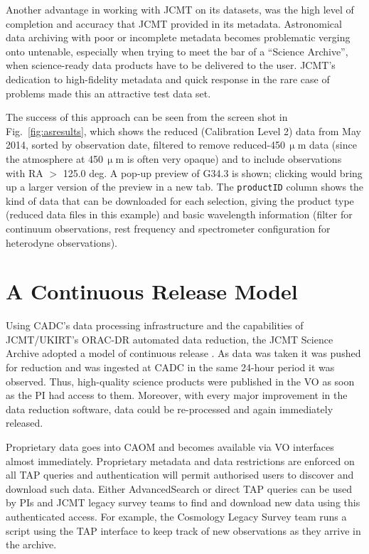 \documentclass[final,authoryear,5p,times,twocolumn]{elsarticle}
\begin{document}
Another advantage in working with JCMT on its datasets, was the high
level of completion and accuracy that JCMT provided in its
metadata. Astronomical data archiving with poor or incomplete metadata
becomes problematic verging onto untenable, especially when trying to
meet the bar of a ``Science Archive'', when science-ready data products
have to be delivered to the user. JCMT's dedication to high-fidelity
metadata and quick response in the rare case of problems made this an
attractive test data set.

The success of
this approach can be seen from the screen shot in Fig.~\ref{fig:asresults},
which shows the reduced (Calibration Level 2) data from May 2014, sorted by
observation date, filtered to remove reduced-450\,$\upmu$m data (since the atmosphere
at 450\,$\upmu$m is often very opaque) and to include observations with RA $>$ 125.0 deg.
A pop-up preview of G34.3 is shown; clicking would bring up a larger version
of the preview in a new tab.  The \texttt{productID} column shows the kind of data that
can be downloaded for each selection, giving the product type (reduced data files in
this example) and basic wavelength information (filter for continuum observations,
rest frequency and spectrometer configuration for heterodyne observations).

\section{A Continuous Release Model}

Using CADC's data processing infrastructure and the capabilities of
JCMT/UKIRT's ORAC-DR automated data reduction, the JCMT Science
Archive adopted a model of continuous release
\citep{2011ASPC..442..203E}. As data was taken it was pushed for
reduction and was ingested at CADC in the same 24-hour period it was
observed. Thus, high-quality science products were published in the VO
as soon as the PI had access to them. Moreover, with every major
improvement in the data reduction software, data could be re-processed
and again immediately released.

Proprietary data goes into CAOM and becomes available via VO
interfaces almost immediately. Proprietary metadata and data
restrictions are enforced on all TAP \citep{tap} queries and authentication will
permit authorised users to discover and download such data. Either
AdvancedSearch or direct TAP queries can be used by PIs and JCMT
legacy survey teams to find and download new data using this
authenticated access. For example, the Cosmology Legacy Survey team
\citep{2013MNRAS.432...53G} runs a script using the TAP interface to
keep track of new observations as they arrive in the archive.
\end{document}
